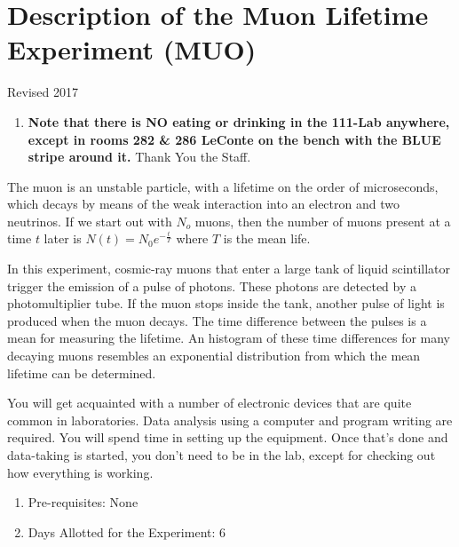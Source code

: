 \documentclass{../lab}
\begin{document}
\maketitle

\tableofcontents

\section{Description of the Muon Lifetime Experiment (MUO)}

Revised 2017

\begin{enumerate}
    \item \textbf{Note that there is NO eating or drinking in the 111-Lab anywhere, except in rooms 282 \& 286 LeConte on the bench with the BLUE stripe around it.} Thank You the Staff.

\end{enumerate}

The muon is an unstable particle, with a lifetime on the order of microseconds, which decays by means of the weak interaction into an electron and two neutrinos. If we start out with $N_o$ muons, then the number of muons present at a time $t$ later is $N(t) = N_0 e^{-\frac{t}{T}}$ where $T$ is the mean life.

In this experiment, cosmic-ray muons that enter a large tank of liquid scintillator trigger the emission of a pulse of photons. These photons are detected by a photomultiplier tube. If the muon stops inside the tank, another pulse of light is produced when the muon decays. The time difference between the pulses is a mean for measuring the lifetime. An histogram of these time differences for many decaying muons resembles an exponential distribution from which the mean lifetime can be determined.

You will get acquainted with a number of electronic devices that are quite common in laboratories. Data analysis using a computer and program writing are required. You will spend time in setting up the equipment. Once that's done and data-taking is started, you don't need to be in the lab, except for checking out how everything is working.

\begin{enumerate}
    \item Pre-requisites: None

    \item Days Allotted for the Experiment: 6
\end{enumerate}
\end{document}
